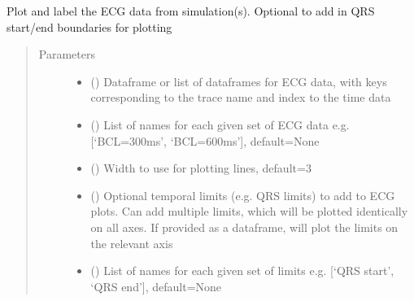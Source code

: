 \documentclass[letterpaper,10pt,english]{sphinxmanual}
\begin{document}
\begin{fulllineitems}
\sphinxAtStartPar
Plot and label the ECG data from simulation(s). Optional to add in QRS start/end boundaries for plotting
\begin{quote}\begin{description}
\item[{Parameters}] \leavevmode\begin{itemize}
\item {} 
\sphinxAtStartPar
{} () \textendash{} Dataframe or list of dataframes for ECG data, with keys corresponding to the trace name and index to the time
data

\item {} 
\sphinxAtStartPar
{} (\sphinxstyleliteralemphasis{\sphinxupquote{, }}) \textendash{} List of names for each given set of ECG data e.g. {[}‘BCL=300ms’, ‘BCL=600ms’{]}, default=None

\item {} 
\sphinxAtStartPar
{} (\sphinxstyleliteralemphasis{\sphinxupquote{, }}) \textendash{} Width to use for plotting lines, default=3

\item {} 
\sphinxAtStartPar
{} (\sphinxstyleliteralemphasis{\sphinxupquote{, }}) \textendash{} Optional temporal limits (e.g. QRS limits) to add to ECG plots. Can add multiple limits, which will be
plotted identically on all axes. If provided as a dataframe, will plot the limits on the relevant axis

\item {} 
\sphinxAtStartPar
{} (\sphinxstyleliteralemphasis{\sphinxupquote{, }}) \textendash{} List of names for each given set of limits e.g. {[}‘QRS start’, ‘QRS end’{]}, default=None


\end{itemize}
\end{description}
\end{quote}
\end{fulllineitems}
\end{document}
